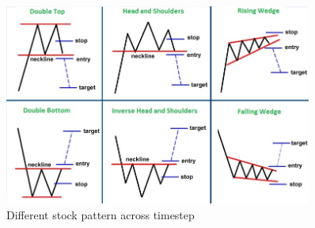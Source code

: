 \begin{figure}[htpb]
\begin{center}
\includegraphics[width=0.9\textwidth]{./figs/chart-patterns}
\vspace{-0.2cm}
\caption{Different stock pattern across timestep \cite{chartpattern}}
\label{fig_pattern}
\end{center}
\vspace{-0.4cm}
\end{figure}



